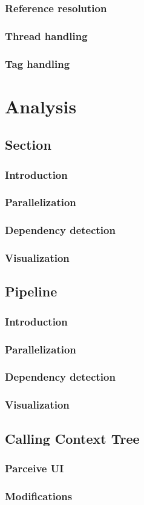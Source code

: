 \subsubsection{Reference resolution}
\subsubsection{Thread handling}
\subsubsection{Tag handling}

\section{Analysis}

\subsection{Section}
\subsubsection{Introduction}
\subsubsection{Parallelization}
\subsubsection{Dependency detection}
\subsubsection{Visualization}

\subsection{Pipeline}
\subsubsection{Introduction}
\subsubsection{Parallelization}
\subsubsection{Dependency detection}
\subsubsection{Visualization}

\subsection{Calling Context Tree}
\subsubsection{Parceive UI}
\subsubsection{Modifications}





